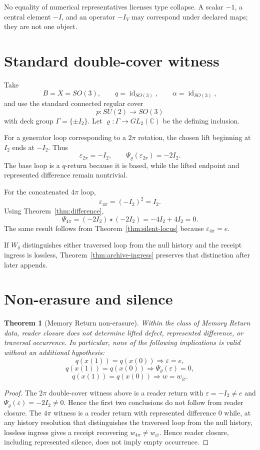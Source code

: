 \documentclass[11pt]{article}
\newtheorem{theorem}{Theorem}[section]
\begin{document}
No equality of numerical representatives licenses type collapse. A scalar $-1$, a central element $-I$, and an operator $-I_V$ may correspond under declared maps; they are not one object.

\section{Standard double-cover witness}
Take
\[
B=X=SO(3),
\qquad
q=\operatorname{id}_{SO(3)},
\qquad
\alpha=\operatorname{id}_{SO(3)},
\]
and use the standard connected regular cover
\[
p:SU(2)\to SO(3)
\]
with deck group $\Gamma=\{\pm I_2\}$. Let $\varrho:\Gamma\to GL_2(\mathbb C)$ be the defining inclusion.

For a generator loop corresponding to a $2\pi$ rotation, the chosen lift beginning at $I_2$ ends at $-I_2$. Thus
\[
\varepsilon_{2\pi}=-I_2,
\qquad
\Psi_{\varrho}(\varepsilon_{2\pi})=-2I_2.
\]
The base loop is a $q$-return because it is based, while the lifted endpoint and represented difference remain nontrivial.

For the concatenated $4\pi$ loop,
\[
\varepsilon_{4\pi}=(-I_2)^2=I_2.
\]
Using Theorem~\ref{thm:difference},
\[
\Psi_{4\pi}
=(-2I_2)\star(-2I_2)
=-4I_2+4I_2
=0.
\]
The same result follows from Theorem~\ref{thm:silent-locus} because $\varepsilon_{4\pi}=e$.

If $W_\delta$ distinguishes either traversed loop from the null history and the receipt ingress is lossless, Theorem~\ref{thm:archive-ingress} preserves that distinction after later appends.

\section{Non-erasure and silence}
\begin{theorem}[Memory Return non-erasure]\label{thm:nonerasure}
Within the class of Memory Return data, reader closure does not determine lifted defect, represented difference, or traversal occurrence. In particular, none of the following implications is valid without an additional hypothesis:
\[
q(x(1))=q(x(0))\Longrightarrow\varepsilon=e,
\]
\[
q(x(1))=q(x(0))\Longrightarrow\Psi_{\varrho}(\varepsilon)=0,
\]
\[
q(x(1))=q(x(0))\Longrightarrow w=w_{\varnothing}.
\]
\end{theorem}
\begin{proof}
The $2\pi$ double-cover witness above is a reader return with $\varepsilon=-I_2\neq e$ and $\Psi_{\varrho}(\varepsilon)=-2I_2\neq0$. Hence the first two conclusions do not follow from reader closure. The $4\pi$ witness is a reader return with represented difference $0$ while, at any history resolution that distinguishes the traversed loop from the null history, lossless ingress gives a receipt recovering $w_{4\pi}\neq w_{\varnothing}$. Hence reader closure, including represented silence, does not imply empty occurrence.
\end{proof}
\end{document}

